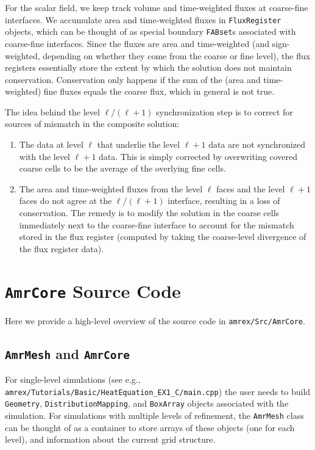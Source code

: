 For the scalar field, we keep track volume and time-weighted fluxes at coarse-fine interfaces.
We accumulate area and time-weighted fluxes in {\tt FluxRegister} objects, which can be
thought of as special boundary {\tt FABset}s associated with coarse-fine interfaces.
Since the fluxes are area and time-weighted (and sign-weighted, depending on whether they
come from the coarse or fine level), the flux registers essentially store the extent by
which the solution does not maintain conservation.  Conservation only happens if the
sum of the (area and time-weighted) fine fluxes equals the coarse flux, which in general 
is not true.

The idea behind the level $\ell/(\ell+1)$ synchronization step is to correct for sources of 
mismatch in the composite solution:
\begin{enumerate}
\item The data at level $\ell$ that underlie the level  $\ell+1$ data are not synchronized with the level $\ell+1$ data.
This is simply corrected by overwriting covered coarse cells to be the average of the overlying fine cells.
\item The area and time-weighted fluxes from the level $\ell$ faces and the level $\ell+1$ faces
do not agree at the $\ell/(\ell+1)$ interface, resulting in a loss of conservation.  
The remedy is to modify the solution in the coarse cells immediately next to the coarse-fine interface
to account for the mismatch stored in the flux register (computed by taking the coarse-level divergence of the
flux register data).
\end{enumerate}

\section{{\tt AmrCore} Source Code \label{ss:amrcore}}
Here we provide a high-level overview of the source code in {\tt amrex/Src/AmrCore}.

\subsection{{\tt AmrMesh} and {\tt AmrCore}}

For single-level simulations
(see e.g., {\tt amrex/Tutorials/Basic/HeatEquation\_EX1\_C/main.cpp})
the user needs to build {\tt Geometry}, {\tt DistributionMapping},
and {\tt BoxArray} objects associated with the simulation.  For simulations
with multiple levels of refinement, the {\tt AmrMesh} class can be thought
of as a container to store arrays of these objects (one for each level), and
information about the current grid structure.


